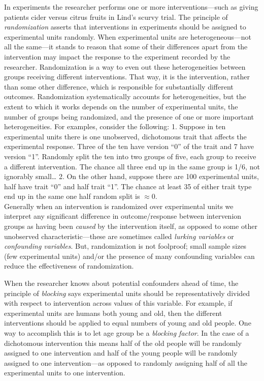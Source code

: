 \documentclass[
]{book}
\begin{document}
In experiments the researcher performs one or more interventions---such as giving patients cider versus citrus fruits in Lind's scurvy trial. The principle of \emph{randomization} asserts that interventions in experiments should be assigned to experimental units randomly. When experimental units are heterogeneous---not all the same---it stands to reason that some of their differences apart from the intervention may impact the response to the experiment recorded by the researcher. Randomization is a way to even out these heterogeneities between groups receiving different interventions. That way, it is the intervention, rather than some other difference, which is responsible for substantially different outcomes. Randomization systematically accounts for heterogeneities, but the extent to which it works depends on the number of experimental units, the number of groups being randomized, and the presence of one or more important heterogeneities. For examples, consider the following:
1. Suppose in ten experimental units there is one unobserved, dichotomous trait that affects the experimental response. Three of the ten have version ``0'' of the trait and 7 have version ``1''. Randomly split the ten into two groups of five, each group to receive a different intervention. The chance all three end up in the same group is 1/6, not ignorably small\ldots{}
2. On the other hand, suppose there are 100 experimental units, half have trait ``0'' and half trait ``1''. The chance at least 35 of either trait type end up in the same one half random split is \(\approx 0\).\\
Generally when an intervention is randomized over experimental units we interpret any significant difference in outcome/response between intervenion groups as having been \emph{caused} by the intervention itself, as opposed to some other unobserved characteristic---these are sometimes called \emph{lurking variables} or \emph{confounding variables}. But, randomization is not foolproof; small sample sizes (few experimental units) and/or the presence of many confounding variables can reduce the effectiveness of randomization.

When the researcher knows about potential confounders ahead of time, the principle of \emph{blocking} says experimental units should be representatively divided with respect to intervention across values of this variable. For example, if experimental units are humans both young and old, then the different interventions should be applied to equal numbers of young and old people. One way to accomplish this is to let age group be a \emph{blocking factor}. In the case of a dichotomous intervention this means half of the old people will be randomly assigned to one intervention and half of the young people will be randomly assigned to one intervention---as opposed to randomly assigning half of all the experimental units to one intervention.
\end{document}
